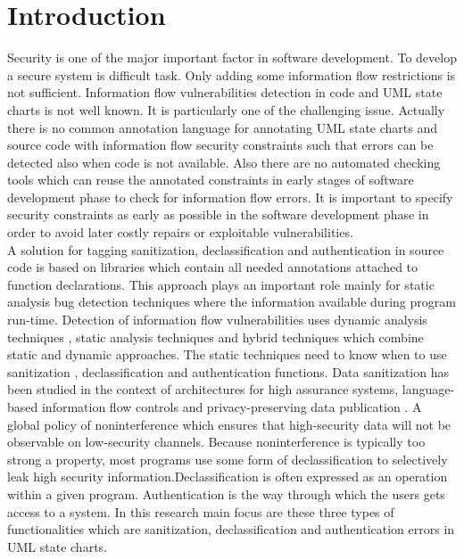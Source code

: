 \chapter{Introduction}
\label{chapter:Introduction}
Security is one of the major important factor in software development. To develop a secure system is difficult task. Only adding some information flow restrictions is not sufficient. Information flow vulnerabilities detection in code and UML state charts is not well known. It is particularly one of the challenging issue. Actually there is no common annotation language for annotating UML state charts and source code with
information flow security constraints such that errors can be detected also when code is not available. Also there are
no automated checking tools which can reuse the annotated constraints in early stages of software development phase to check
for information flow errors. It is important to specify security constraints as early as possible in the software
development phase in order to avoid later costly repairs or exploitable vulnerabilities.\\

A solution for tagging sanitization, declassification and authentication in source code is based on libraries which contain all needed annotations attached to function declarations. This approach plays an important role mainly for static analysis bug detection techniques where the information available during program run-time. Detection of information flow vulnerabilities uses dynamic analysis techniques , static analysis techniques and hybrid techniques which combine static and dynamic approaches. The static techniques need to know when to use  sanitization , declassification and authentication functions. Data sanitization has been studied in the context of architectures for high assurance systems, language-based information flow controls and privacy-preserving data publication \cite{ref_1_gehani2011f}. A global policy of noninterference which ensures that high-security data will not be observable on low-security channels. Because noninterference is typically
too strong a property, most programs use some form of declassification to selectively leak high security  information\cite{ref_2_hicks2006trusted}.Declassification is often expressed as an operation within a given
program. Authentication is the way through which the users gets access to a system. In this research main focus are these three types of functionalities which are sanitization, declassification and authentication errors in UML state charts. \\

